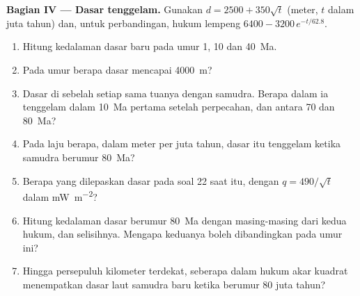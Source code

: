 \begin{problem}
\medskip
\noindent\textbf{Bagian IV --- Dasar tenggelam.} Gunakan $d = 2500 + 350\sqrt t$ (meter, $t$ dalam juta tahun) dan, untuk perbandingan, hukum lempeng $6400 - 3200\,e^{-t/62.8}$.
\begin{enumerate}[resume]
  \item Hitung kedalaman dasar baru pada umur 1, 10 dan \qty{40}{Ma}.
  \item Pada umur berapa dasar mencapai \qty{4000}{m}?
  \item Dasar di sebelah setiap  sama tuanya dengan samudra. Berapa dalam ia tenggelam dalam \qty{10}{Ma} pertama setelah perpecahan, dan antara 70 dan \qty{80}{Ma}?
  \item Pada laju berapa, dalam meter per juta tahun, dasar itu tenggelam ketika samudra berumur \qty{80}{Ma}?
  \item Berapa  yang dilepaskan dasar pada soal 22 saat itu, dengan $q = 490/\sqrt t$ dalam \unit{mW.m^{-2}}?
  \item Hitung kedalaman dasar berumur \qty{80}{Ma} dengan masing-masing dari kedua hukum, dan selisihnya. Mengapa keduanya boleh dibandingkan pada umur ini?
  \item Hingga persepuluh kilometer terdekat, seberapa dalam hukum akar kuadrat menempatkan dasar laut samudra baru ketika berumur 80 juta tahun?
\end{enumerate}
\end{problem}

